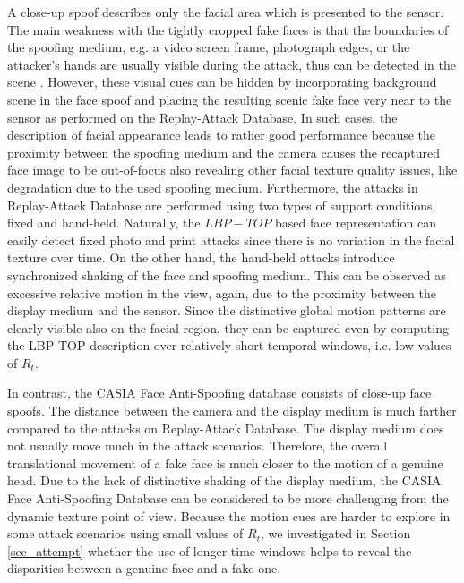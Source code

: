 A close-up spoof describes only the facial area which is presented to the sensor. The main weakness with the tightly cropped fake faces is that the boundaries of the spoofing medium, e.g. a video screen frame, photograph edges, or the attacker's hands are usually visible during the attack, thus can be detected in the scene \cite{JukkaLBP2012}. However, these visual cues can be hidden by incorporating background scene in the face spoof and placing the resulting scenic fake face very near to the sensor as performed on the Replay-Attack Database. In such cases, the description of facial appearance leads to rather good performance because the proximity between the spoofing medium and the camera causes the recaptured face image to be out-of-focus also revealing other facial texture quality issues, like degradation due to the used spoofing medium. Furthermore, the attacks in Replay-Attack Database are performed using two types of support conditions, fixed and hand-held. Naturally, the $LBP-TOP$ based face representation can easily detect fixed photo and print attacks since there is no variation in the facial texture over time. On the other hand, the hand-held attacks introduce synchronized shaking of the face and spoofing medium. This can be observed as excessive relative motion in the view, again, due to the proximity between the display medium and the sensor. Since the distinctive global motion patterns are clearly visible also on the facial region, they can be captured even by computing the LBP-TOP description over relatively short temporal windows, i.e. low values of $R_t$.

In contrast, the CASIA Face Anti-Spoofing database consists of close-up face spoofs. The distance between the camera and the display medium is much farther compared to the attacks on Replay-Attack Database. The display medium does not usually move much in the attack scenarios. Therefore, the overall translational movement of a fake face is much closer to the motion of a genuine head. Due to the lack of distinctive shaking of the display medium, the CASIA Face Anti-Spoofing Database can be considered to be more challenging from the dynamic texture point of view. Because the motion cues are harder to explore in some attack scenarios using small values of $R_t$, we investigated in Section \ref{sec_attempt} whether the use of longer time windows helps to reveal the disparities between a genuine face and a fake one.


